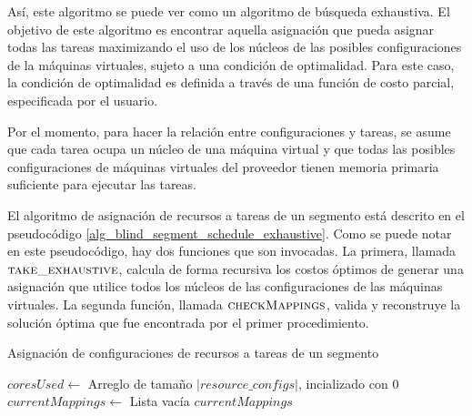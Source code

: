 
Así, este algoritmo se puede ver como un algoritmo de búsqueda exhaustiva. El objetivo de este algoritmo es encontrar aquella asignación que pueda asignar todas las tareas maximizando el uso de los núcleos de las posibles configuraciones de la máquinas virtuales, sujeto a una condición de optimalidad. Para este caso, la condición de optimalidad es definida a trav\'es de una funci\'on de costo parcial, especificada por el usuario. 

Por el momento, para hacer la relaci\'on entre configuraciones y tareas, se asume que cada tarea ocupa un núcleo de una máquina virtual y que todas las posibles configuraciones de máquinas virtuales del proveedor tienen memoria primaria suficiente para ejecutar las tareas.

El algoritmo de asignación de recursos a tareas de un segmento está descrito en el pseudocódigo \ref{alg_blind_segment_schedule_exhaustive}. Como se puede notar en este pseudocódigo, hay dos funciones que son invocadas. La primera, llamada $\Call{take\_exhaustive}{}$, calcula de forma recursiva los costos óptimos de generar una asignación que utilice todos los núcleos de las configuraciones de las máquinas virtuales. La segunda funci\'on, llamada $\Call{checkMappings}{}$, valida y reconstruye la soluci\'on \'optima que fue encontrada por el primer procedimiento.

\begin{algorithm}
\caption{Asignación de configuraciones de recursos a tareas de un segmento}
\label{alg_blind_segment_schedule_exhaustive}
\begin{algorithmic}[1]

	\State $coresUsed \gets$ Arreglo de tamaño $|resource\_configs|$, incializado con 0
	\State $currentMappings \gets$ Lista vacía	
	\State {}
	\State \Return $currentMappings$
\EndProcedure
\end{algorithmic}
\end{algorithm}



